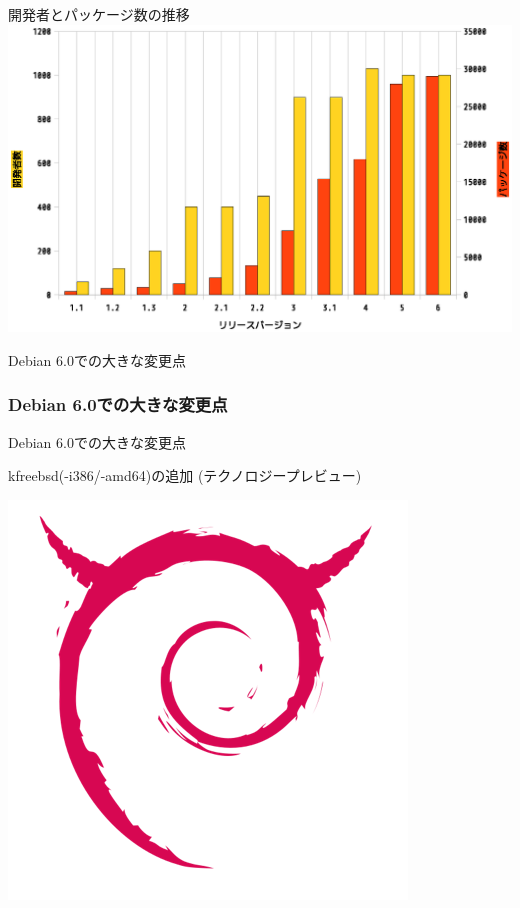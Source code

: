 \begin{frame}{開発者とパッケージ数の推移}
\includegraphics[width=1.2\vsize]{image201103/debian-squeeze-graph00.eps}
\end{frame}

\begin{frame}{Debian 6.0での大きな変更点}
 \frametitle{Debian 6.0での大きな変更点}
\end{frame}

\begin{frame}{Debian 6.0での大きな変更点}
\begin{center}
\large kfreebsd(-i386/-amd64)の追加 (テクノロジープレビュー)

\includegraphics[width=0.7\vsize]{image201103/debian-kfreebsd.png}
\end{center}
\end{frame}


